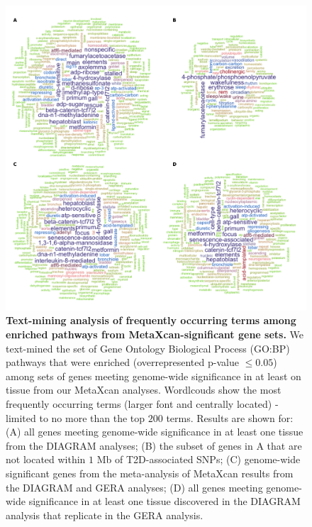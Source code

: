 \documentclass[10pt]{article}
\begin{document}
\begin{figure}
\includegraphics[width=\textwidth]{wordplots.pdf}
	\caption{\textbf{Text-mining analysis of frequently occurring terms among enriched pathways from MetaXcan-significant gene sets.} We text-mined the set of Gene Ontology Biological Process (GO:BP) pathways that were enriched (overrepresented p-value $\leq 0.05$) among sets of genes meeting genome-wide significance in at least on tissue from our MetaXcan analyses. Wordlcouds show the most frequently occurring terms (larger font and centrally located) - limited to no more than the top $200$ terms. Results are shown for: (A) all genes meeting genome-wide significance in at least one tissue from the DIAGRAM analyses; (B) the subset of genes in A that are not located within $1$ Mb of T2D-associated SNPs; (C) genome-wide significant genes from the meta-analysis of MetaXcan results from the DIAGRAM and GERA analyses; (D) all genes meeting genome-wide significance in at least one tissue discovered in the DIAGRAM analysis that replicate in the GERA analysis.} 
    \label{fig:supp_fig2_wordplots}
\end{figure}
\end{document}
